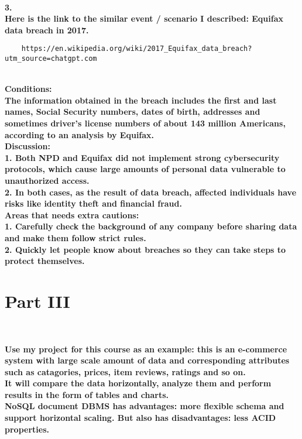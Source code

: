 \documentclass[letterpaper,11pt]{article}
\newcommand{\Paragraph}[1]{~\vspace*{-0.7\baselineskip}\\{\bf #1}}
\begin{document}
\Paragraph{3. \\
	Here is the link to the similar event / scenario I described: Equifax data breach in 2017. 
}
\begin{verbatim}
	https://en.wikipedia.org/wiki/2017_Equifax_data_breach?utm_source=chatgpt.com
\end{verbatim}
\Paragraph{
	Conditions: \\
	The information obtained in the breach includes the first and last names, Social Security numbers, dates of birth, addresses and sometimes driver's license numbers of about 143 million Americans, 
	according to an analysis by Equifax.\\
	Discussion:\\
	1. Both NPD and Equifax did not implement strong cybersecurity protocols, which cause large amounts of personal data vulnerable to unauthorized access.\\
	2. In both cases, as the result of data breach, affected individuals have risks like identity theft and financial fraud. \\
	Areas that needs extra cautions: \\
	1. Carefully check the background of any company before sharing data and make them follow strict rules.\\
	2. Quickly let people know about breaches so they can take steps to protect themselves.\\

}


\section*{Part III}
\Paragraph{
	Use my project for this course as an example: this is an e-commerce system with large scale amount of data and corresponding attributes such as catagories, prices, item reviews, ratings and so on. \\
	It will compare the data horizontally, analyze them and perform results in the form of tables and charts. \\
	NoSQL document DBMS has advantages: more flexible schema and support horizontal scaling. But also has disadvantages: less ACID properties. 

}
\end{document}
